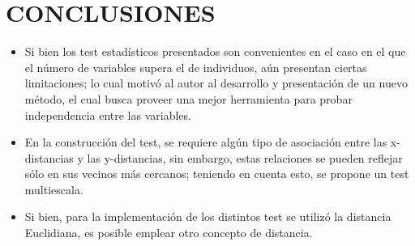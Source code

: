 \documentclass[]{book}
\begin{document}
\chapter{CONCLUSIONES}\label{conclusiones}

\begin{itemize}
\item
  Si bien los test estadísticos presentados son convenientes en el caso
  en el que el número de variables supera el de individuos, aún
  presentan ciertas limitaciones; lo cual motivó al autor al desarrollo
  y presentación de un nuevo método, el cual busca proveer una mejor
  herramienta para probar independencia entre las variables.
\item
  En la construcción del test, se requiere algún tipo de asociación
  entre las x-distancias y las y-distancias, sin embargo, estas
  relaciones se pueden reflejar sólo en sus vecinos más cercanos;
  teniendo en cuenta esto, se propone un test multiescala.
\item
  Si bien, para la implementación de los distintos test se utilizó la
  distancia Euclidiana, es posible emplear otro concepto de distancia.
\end{itemize}


\end{document}
